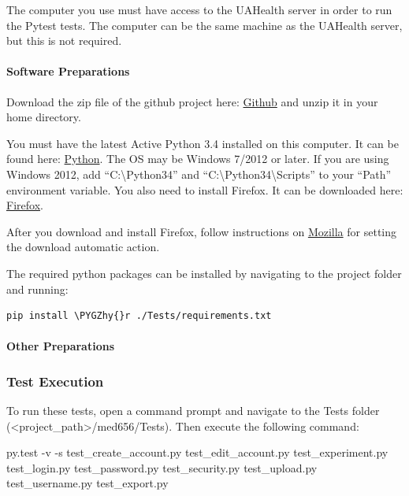 \documentclass[letterpaper,10pt,english]{sphinxmanual}
\def\PYGZhy{\char`\-}
\begin{document}
The computer you use must have access to the UAHealth server in order to run the Pytest tests.
The computer can be the same machine as the UAHealth server, but this is not required.


\paragraph{Software Preparations}
\label{STD/pytest_test_descriptions:software-preparations}
Download the zip file of the github project here: \href{https://github.com/trwq63/med656}{Github} and unzip it in your home directory.

You must have the latest Active Python 3.4 installed on this computer. It can be found here: \href{http://www.activestate.com/activepython/downloads}{Python}. The OS may be Windows
7/2012 or later. If you are using Windows 2012, add ``C:\textbackslash{}Python34'' and ``C:\textbackslash{}Python34\textbackslash{}Scripts'' to your ``Path'' environment variable.
You also need to install Firefox. It can be downloaded here: \href{https://www.mozilla.org/en-US/firefox/new/}{Firefox}.

After you download and install Firefox, follow instructions on \href{http://kb.mozillazine.org/File\_types\_and\_download\_actions}{Mozilla} for setting the download automatic action.

The required python packages can be installed by navigating to the project folder and running:

\begin{Verbatim}[commandchars=\\\{\}]
pip install \PYGZhy{}r ./Tests/requirements.txt
\end{Verbatim}


\paragraph{Other Preparations}
\label{STD/pytest_test_descriptions:other-preparations}\label{STD/pytest_test_descriptions:mozilla}

\subsubsection{Test Execution}
\label{STD/pytest_test_descriptions:test-execution}
To run these tests, open a command prompt and navigate to the Tests folder (\textless{}project\_path\textgreater{}/med656/Tests). Then execute
the following command:

py.test -v -s test\_create\_account.py test\_edit\_account.py test\_experiment.py test\_login.py test\_password.py test\_security.py test\_upload.py test\_username.py test\_export.py
\end{document}
